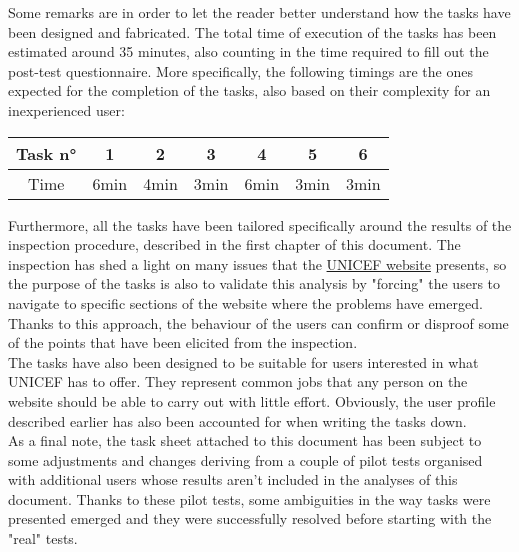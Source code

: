 
	
Some remarks are in order to let the reader better understand how the tasks have been designed and fabricated. 
The total time of execution of the tasks has been estimated around 35 minutes, also counting in the time required to fill out the post-test questionnaire. More specifically, the following timings are the ones expected for the completion of the tasks, also based on their complexity for an inexperienced user:

\vspace{0.5cm}

{
	\renewcommand{\arraystretch}{1.45}
	\setlength{\tabcolsep}{0.5cm}
	\centering 
\begin{tabular}{c| c c c c c c}
	Task n° &1 & 2 & 3 & 4 & 5 & 6\\
	\hline
	Time & 6min & 4min & 3min & 6min & 3min & 3min
	
\end{tabular}

}

\vspace{0.5cm}

Furthermore, all the tasks have been tailored specifically around the results of the inspection procedure, described in the first chapter of this document. The inspection has shed a light on many issues that the \href{https://www.unicef.org/}{UNICEF website} presents, so the purpose of the tasks is also to validate this analysis by "forcing" the users to navigate to specific sections of the website where the problems have emerged. Thanks to this approach, the behaviour of the users can confirm or disproof some of the points that have been elicited from the inspection.\\
The tasks have also been designed to be suitable for users interested in what UNICEF has to offer. They represent common jobs that any person on the website should be able to carry out with little effort. Obviously, the user profile described earlier has also been accounted for when writing the tasks down.\\
As a final note, the task sheet attached to this document has been subject to some adjustments and changes deriving from a couple of pilot tests organised with additional users whose results aren't included in the analyses of this document. Thanks to these pilot tests, some ambiguities in the way tasks were presented emerged and they were successfully resolved before starting with the "real" tests.\\

